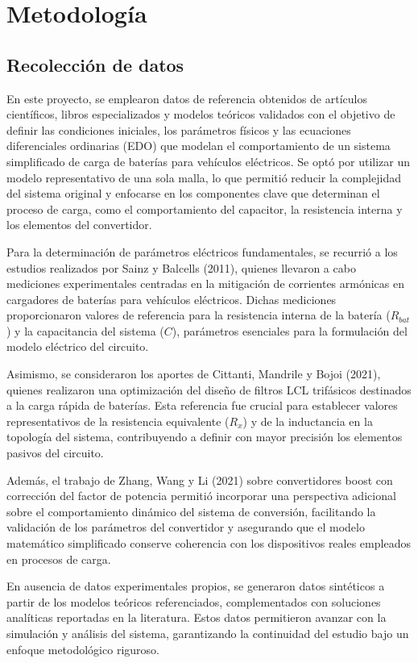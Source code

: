 \section{Metodología}

\subsection{Recolección de datos}
En este proyecto, se emplearon datos de referencia obtenidos de artículos científicos, libros
especializados y modelos teóricos validados con el objetivo de definir las condiciones iniciales, los
parámetros físicos y las ecuaciones diferenciales ordinarias (EDO) que modelan el comportamiento de
un sistema simplificado de carga de baterías para vehículos eléctricos. Se optó por utilizar un modelo
representativo de una sola malla, lo que permitió reducir la complejidad del sistema original y
enfocarse en los componentes clave que determinan el proceso de carga, como el comportamiento del
capacitor, la resistencia interna y los elementos del convertidor.

Para la determinación de parámetros eléctricos fundamentales, se recurrió a los estudios realizados por
Sainz y Balcells (2011), quienes llevaron a cabo mediciones experimentales centradas en la
mitigación de corrientes armónicas en cargadores de baterías para vehículos eléctricos. Dichas
mediciones proporcionaron valores de referencia para la resistencia interna de la batería (\(R_{bat}\)) y la
capacitancia del sistema (\(C\)), parámetros esenciales para la formulación del modelo eléctrico del
circuito.

Asimismo, se consideraron los aportes de Cittanti, Mandrile y Bojoi (2021), quienes realizaron una
optimización del diseño de filtros LCL trifásicos destinados a la carga rápida de baterías. Esta
referencia fue crucial para establecer valores representativos de la resistencia equivalente (\(R_x\)) y de la
inductancia en la topología del sistema, contribuyendo a definir con mayor precisión los elementos
pasivos del circuito.

Además, el trabajo de Zhang, Wang y Li (2021) sobre convertidores boost con corrección del factor
de potencia permitió incorporar una perspectiva adicional sobre el comportamiento dinámico del
sistema de conversión, facilitando la validación de los parámetros del convertidor y asegurando que el
modelo matemático simplificado conserve coherencia con los dispositivos reales empleados en
procesos de carga.

En ausencia de datos experimentales propios, se generaron datos sintéticos a partir de los modelos
teóricos referenciados, complementados con soluciones analíticas reportadas en la literatura. Estos
datos permitieron avanzar con la simulación y análisis del sistema, garantizando la continuidad del
estudio bajo un enfoque metodológico riguroso.


